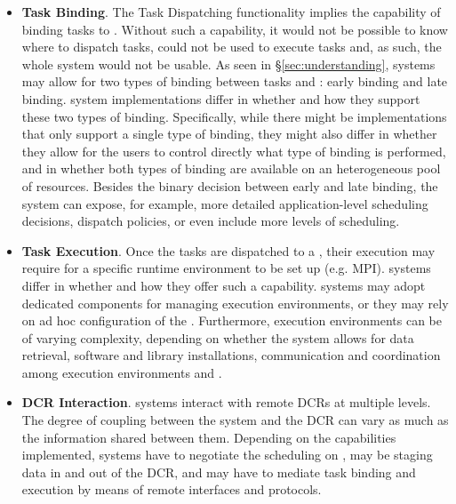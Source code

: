 \documentclass{sig-alternate}
\begin{document}
\begin{itemize}


\item \textbf{Task Binding}. The Task Dispatching functionality implies the
  capability of binding tasks to \pilots. Without such a capability, it would
  not be possible to know where to dispatch tasks, \pilots could not be used to
  execute tasks and, as such, the whole \pilot system would not be usable. As
  seen in \S\ref{sec:understanding}, \pilot systems may allow for two types of
  binding between tasks and \pilots: early binding and late binding. \pilot
  system implementations differ in whether and how they support these two types
  of binding. Specifically, while there might be implementations that only
  support a single type of binding, they might also differ in whether they
  allow for the users to control directly what type of binding is performed,
  and in whether both types of binding are available on an heterogeneous pool
  of resources. Besides the binary decision between early and late binding, the
  \pilot system can expose, for example, more detailed application-level
  scheduling decisions, dispatch policies, or even include more levels of
  scheduling.

\item \textbf{Task Execution}. Once the tasks are dispatched to a \pilot, their
  execution may require for a specific runtime environment to be set up (e.g.
  MPI). \pilot systems differ in whether and how they offer such a capability.
  \pilot systems may adopt dedicated components for managing execution
  environments, or they may rely on ad hoc configuration of the \pilots.
  Furthermore, execution environments can be of varying complexity, depending on
  whether the \pilot system allows for data retrieval, software and library
  installations, communication and coordination among execution environments and
  \pilots.


\item \textbf{DCR Interaction}. \pilot systems interact with remote
  DCRs at multiple levels. The degree of coupling between the \pilot system and
  the DCR can vary as much as the information shared between them. Depending on
  the capabilities implemented, \pilot systems have to negotiate the scheduling
  on \pilots, may be staging data in and out of the DCR, and may have to mediate
  task binding and execution by means of remote interfaces and protocols.


\end{itemize}
\end{document}
